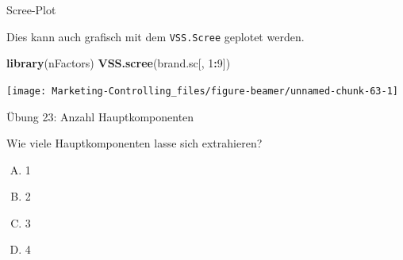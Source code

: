 \documentclass[12pt,ngerman,a4paper,ignorenonframetext,]{beamer}
\newenvironment{Shaded}{\begin{snugshade}}{\end{snugshade}}
\newcommand{\DecValTok}[1]{\textcolor[rgb]{0.00,0.00,0.81}{#1}}
\newcommand{\KeywordTok}[1]{\textcolor[rgb]{0.13,0.29,0.53}{\textbf{#1}}}
\newcommand{\NormalTok}[1]{#1}
\newcommand{\OperatorTok}[1]{\textcolor[rgb]{0.81,0.36,0.00}{\textbf{#1}}}
\providecommand{\tightlist}{%
  \setlength{\itemsep}{0pt}\setlength{\parskip}{0pt}}
\begin{document}
\begin{frame}{Scree-Plot}
\protect\hypertarget{scree-plot-1}{}

Dies kann auch grafisch mit dem \texttt{VSS.Scree} geplotet werden.

\begin{Shaded}
\begin{Highlighting}[]
\KeywordTok{library}\NormalTok{(nFactors)}
\KeywordTok{VSS.scree}\NormalTok{(brand.sc[, }\DecValTok{1}\OperatorTok{:}\DecValTok{9}\NormalTok{])}
\end{Highlighting}
\end{Shaded}

\begin{center}\texttt{[image: Marketing-Controlling\_files/figure-beamer/unnamed-chunk-63-1]} \end{center}

\end{frame}

\begin{frame}{Übung 23: Anzahl Hauptkomponenten}
\protect\hypertarget{ubung-23-anzahl-hauptkomponenten}{}

Wie viele Hauptkomponenten lasse sich extrahieren?

\begin{enumerate}
[A.]
\tightlist
\item
  1
\item
  2
\item
  3
\item
  4
\end{enumerate}


\end{frame}
\end{document}
